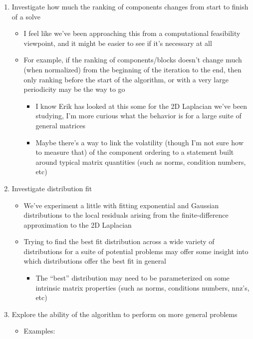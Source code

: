 \documentclass{article}
\theoremstyle{definition}
\theoremstyle{example}
\theoremstyle{example}
\theoremstyle{example}
\begin{document}
\begin{enumerate}
	\item Investigate how much the ranking of components changes from start to finish of a solve
		\begin{itemize}
			\item I feel like we've been approaching this from a computational feasibility viewpoint, and it might be easier to see if it's necessary at all
			\item For example, if the ranking of components/blocks doesn't change much (when normalized) from the beginning of the iteration to the end, then only ranking before the start of the algorithm, or with a very large periodicity may be the way to go
				\begin{itemize}
					\item I know Erik has looked at this some for the 2D Laplacian we've been studying, I'm more curious what the behavior is for a large suite of general matrices
					\item Maybe there's a way to link the volatility (though I'm not sure how to measure that) of the component ordering to a statement built around typical matrix quantities (such as norms, condition numbers, etc)
				\end{itemize}
		\end{itemize}
	\item Investigate distribution fit
		\begin{itemize}
			\item We've experiment a little with fitting exponential and Gaussian distributions to the local residuals arising from the finite-difference approximation to the 2D Laplacian
			\item Trying to find the best fit distribution across a wide variety of distributions for a suite of potential problems may offer some insight into which distributions offer the best fit in general
				\begin{itemize}
					\item The ``best'' distribution may need to be parameterized on some intrinsic matrix properties (such as norms, conditions numbers, nnz's, etc)
				\end{itemize}
		\end{itemize}
	\item Explore the ability of the algorithm to perform on more general problems
		\begin{itemize}
			\item Examples: 
				\begin{itemize}

\end{itemize}
\end{itemize}
\end{enumerate}
\end{document}
